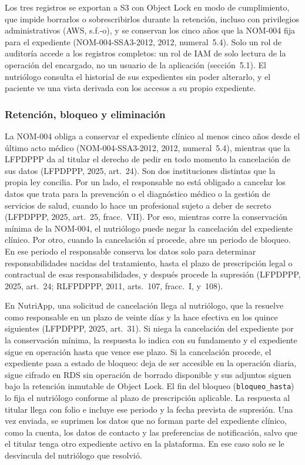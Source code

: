 \documentclass[12pt, a4paper]{article}
\begin{document}
Los tres registros se exportan a S3 con Object Lock en modo de
cumplimiento, que impide borrarlos o sobrescribirlos durante la
retención, incluso con privilegios administrativos (AWS, s.f.-o),
y se conservan los cinco años que la NOM-004 fija para el
expediente (NOM-004-SSA3-2012, 2012, numeral~5.4). Solo un rol de
auditoría accede a los registros completos: un rol de IAM de solo
lectura de la operación del encargado, no un usuario de la aplicación
(sección~5.1). El nutriólogo consulta
el historial de sus expedientes sin poder alterarlo, y el paciente
ve una vista derivada con los accesos a su propio expediente.
 
\subsubsection{Retención, bloqueo y eliminación}
 
La NOM-004 obliga a conservar el expediente clínico al menos cinco
años desde el último acto médico (NOM-004-SSA3-2012, 2012,
numeral~5.4), mientras que la LFPDPPP da al titular el derecho de
pedir en todo momento la cancelación de sus datos (LFPDPPP, 2025,
art.~24). Son dos instituciones distintas que la propia ley concilia.
Por un lado, el responsable no está obligado a cancelar los datos que
trata para la prevención o el diagnóstico médico o la gestión de
servicios de salud, cuando lo hace un profesional sujeto a deber de
secreto (LFPDPPP, 2025, art.~25, fracc.~VII). Por eso, mientras corre la
conservación mínima de la NOM-004, el nutriólogo puede negar la
cancelación del expediente clínico. Por otro, cuando la cancelación sí
procede, abre un periodo de bloqueo. En ese periodo el responsable
conserva los datos solo para determinar responsabilidades nacidas del
tratamiento, hasta el plazo de prescripción legal o contractual de esas
responsabilidades, y después procede la supresión (LFPDPPP, 2025,
art.~24; RLFPDPPP, 2011, arts.~107, fracc.~I, y~108).
 
En NutriApp, una solicitud de cancelación llega al nutriólogo, que
la resuelve como responsable en un plazo de veinte días y la hace
efectiva en los quince siguientes (LFPDPPP, 2025, art.~31). Si
niega la cancelación del expediente por la conservación mínima, la
respuesta lo indica con su fundamento y el expediente sigue en
operación hasta que vence ese plazo. Si la cancelación procede, el
expediente pasa a estado de bloqueo: deja de ser accesible en la
operación diaria, sigue cifrado en RDS sin operación de borrado
disponible y sus adjuntos siguen bajo la retención inmutable de
Object Lock. El fin del bloqueo (\texttt{bloqueo\_hasta}) lo fija el
nutriólogo conforme al plazo de prescripción aplicable. La respuesta
al titular llega con folio e incluye ese periodo y la fecha prevista
de supresión. Una vez enviada, se suprimen los datos que no forman parte
del expediente clínico, como la cuenta, los datos de contacto y las
preferencias de notificación, salvo que el titular tenga otro expediente
activo en la plataforma. En ese caso solo se le desvincula del
nutriólogo que resolvió.
 
\end{document}
